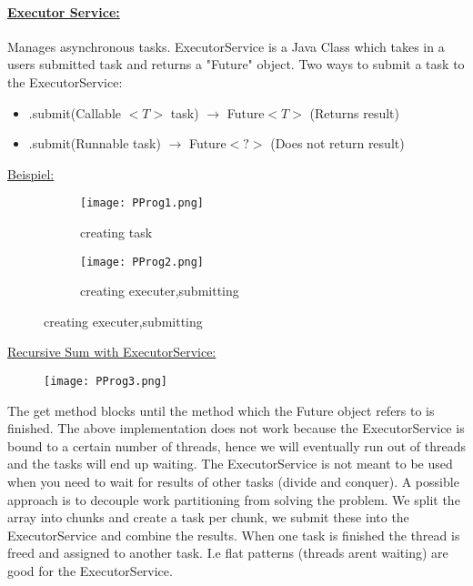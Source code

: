 \documentclass[8pt]{extreport}
\begin{document}
\paragraph{\underline{Executor Service:}} Manages asynchronous tasks. ExecutorService is a Java Class which takes in a users submitted task and returns a "Future" object. Two ways to submit a task to the ExecutorService:
\begin{itemize}
\item .submit(Callable $<T>$ task) $\rightarrow$ Future$<T>$  (Returns result)
\item .submit(Runnable task) $\rightarrow$ Future$<?>$ 	(Does not return result)
\end{itemize} 
\underline{Beispiel:}
\begin{figure}[h!]
	\centering
	\begin{subfigure}[b]{0.49\linewidth}
	\texttt{[image: PProg1.png]}
	\caption{creating task}
	\label{ziehungsmoglichkeiten}
	\end{subfigure}
	\begin{subfigure}[b]{0.49\linewidth}
	\texttt{[image: PProg2.png]}
	\caption{creating executer,submitting}
	\label{ziehungsmoglichkeiten}
	\end{subfigure}
\end{figure}
\newline
\underline{Recursive Sum with ExecutorService:}
\begin{figure}[h!]
	\centering\texttt{[image: PProg3.png]}
	\caption{}
	\label{PProg3}
\end{figure}
\newline
The get method blocks until the method which the Future object refers to is finished. The above implementation does not work because the ExecutorService is bound to a certain number of threads, hence we will eventually run out of threads and the tasks will end up waiting. The ExecutorService is not meant to be used when you need to wait for results of other tasks (divide and conquer). A possible approach is to decouple work partitioning from solving the problem. We split the array into chunks and create a task per chunk, we submit these into the ExecutorService and combine the results. When one task is finished the thread is freed and assigned to another task. I.e flat patterns (threads arent waiting) are good for the ExecutorService.
\end{document}
